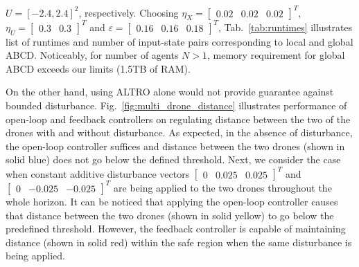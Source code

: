 $U=[-2.4,2.4]^2$, respectively. Choosing  $\eta_{X}=\begin{bmatrix}0.02&0.02&0.02\end{bmatrix}^T$, $\eta_{U}=\begin{bmatrix}0.3&0.3\end{bmatrix}^T$ and $\varepsilon=\begin{bmatrix}0.16&0.16&0.18\end{bmatrix}^T$, Tab.~\ref{tab:runtimes} illustrates list of runtimes and number of input-state pairs corresponding to local and global ABCD. Noticeably, for number of agents $N>1$, memory requirement for global ABCD exceeds our limits (1.5TB of RAM). 


On the other hand, using ALTRO alone would not provide guarantee against bounded disturbance.  %
Fig.~\ref{fig:multi_drone_distance} illustrates performance of open-loop and feedback controllers on regulating distance between the two of 
the drones with and without disturbance. 
As expected, in the absence of disturbance, the open-loop controller suffices and distance between the two drones (shown in solid blue) 
does not go below the defined threshold. 
Next, we consider the case when constant additive disturbance vectors $\begin{bmatrix}0 &0.025&0.025\end{bmatrix}^T$ 
and $\begin{bmatrix}0 &-0.025&-0.025\end{bmatrix}^T$ are being applied to the two drones throughout the whole horizon. 
It can be noticed that applying the open-loop controller causes that distance between the two drones (shown in solid yellow) to 
go below the predefined threshold. 
However, the feedback controller is capable of maintaining distance (shown in solid red) within the safe region when the same disturbance is being applied.


